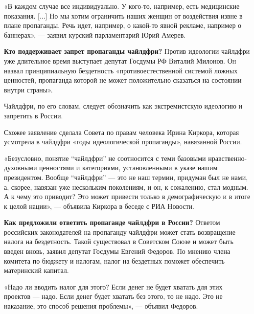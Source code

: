 «В каждом случае все индивидуально.
У кого-то, например, есть медицинские показания.
[...] Но мы хотим ограничить наших женщин от воздействия
извне в плане пропаганды.
Речь идет, например, о какой-то явной рекламе,
например о баннерах», --- заявил курский парламентарий Юрий Амерев.

\textbf{Кто поддерживает запрет пропаганды чайлдфри?}
Против идеологии чайлдфри уже длительное время выступает депутат
Госдумы РФ Виталий Милонов. Он назвал принципиальную бездетность
«противоестественной системой ложных ценностей,
пропаганда которой не может положительно сказаться на состоянии
внутри страны».

Чайлдфри, по его словам, следует обозначить как экстремистскую
идеологию и запретить в России.

Схожее заявление сделала 
Совета по правам человека Ирина Киркора,
которая усмотрела в чайлдфри «годы идеологической пропаганды»,
навязанной России.

«Безусловно, понятие ``чайлдфри'' не соотносится с теми
базовыми нравственно-духовными ценностями и категориями,
установленными в указе нашим президентом.
Вообще ``чайлдфри'' --- это не наш термин, придуман был не нами,
а, скорее, навязан уже нескольким поколениям, и он,
к сожалению, стал модным.
А к чему это приводит? Это может привести только в демографическую
 и в итоге к
 целой нации»,
--- объявила Киркора в беседе с РИА Новости.

\textbf{Как предложили ответить пропаганде чайлдфри в России?}
Ответом российских законодателей на пропаганду чайлдфри может
стать возвращение налога на бездетность.
Такой существовал в Советском Союзе и может быть введен вновь,
заявил депутат Госдумы Евгений Федоров. По мнению члена комитета
по бюджету и налогам, налог на бездетных поможет обеспечить
материнский капитал.

«Надо ли вводить налог для этого?
Если денег не будет хватать для этих проектов --- надо.
Если денег будет хватать без этого, то не надо.
Это не наказание, это способ решения проблемы»,
--- объявил Федоров.
